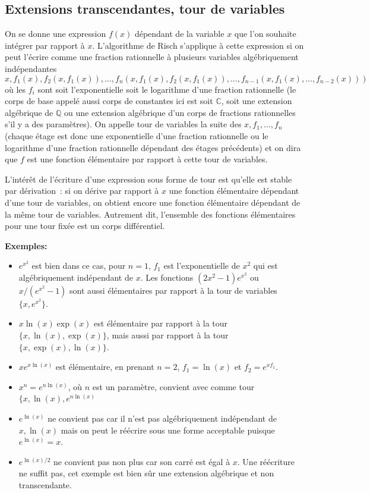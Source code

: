 \documentclass[a4paper,11pt]{book}
\begin{document}
\begin{giacjshere}
\subsection{Extensions transcendantes, tour de variables}
On se donne une expression $f(x)$ dépendant de la variable $x$ que l'on 
souhaite intégrer par rapport à $x$. L'algorithme de Risch s'applique à
cette expression si on peut l'écrire comme une fraction rationnelle à
plusieurs variables algébriquement indépendantes
\[ x, f_1(x), f_2(x,f_1(x)), ..., 
f_n(x,f_1(x),f_2(x,f_1(x)),...,f_{n-1}(x,f_1(x),...,f_{n-2}(x))) \]
où les $f_i$ sont soit l'exponentielle soit le logarithme d'une fraction
rationnelle (le corps de base appelé aussi corps de
constantes ici est soit $\mathbb{C}$, soit une extension algébrique de $\mathbb{Q}$ ou une
extension algébrique d'un corps de fractions rationnelles s'il
y a des paramètres). 
On appelle tour de variables
la suite des $x,f_1,...,f_n$ (chaque étage est donc une exponentielle
d'une fraction rationnelle ou le logarithme d'une fraction rationnelle
dépendant des étages précédents) 
et on dira que $f$ est une fonction élémentaire
par rapport à cette tour de variables.

L'intérêt de l'écriture d'une expression sous forme de tour est 
qu'elle est stable par dérivation~: 
si on dérive par rapport à $x$
une fonction élémentaire dépendant d'une tour de variables, on obtient encore 
une fonction élémentaire dépendant de la même tour de variables.
Autrement dit, l'ensemble des fonctions \'el\'ementaires pour une tour 
fix\'ee est un corps diff\'erentiel.

{\bf Exemples: }
\begin{itemize}
\item $e^{x^2}$ est bien dans ce cas, pour $n=1$, $f_1$
est l'exponentielle de $x^2$ qui est algébriquement indépendant
de $x$. Les fonctions $(2x^2-1)e^{x^2}$
ou $x/(e^{x^2}-1)$ sont aussi élémentaires par rapport à
la tour de variables $\{x,e^{x^2} \}$.  
\item $x \ln(x) \exp(x)$ est élémentaire par rapport à la tour
$\{ x, \ln(x), \exp(x)\}$, mais aussi par rapport à la tour
$\{ x, \exp(x), \ln(x)\}$.
\item $xe^{x \ln(x)}$ est élémentaire, en prenant $n=2$, $f_1=\ln(x)$
et $f_2=e^{x f_1}$.
\item $x^n=e^{n\ln(x)}$, o\`u $n$ est un param\`etre, convient avec
comme tour $\{x, \ln(x), e^{n \ln(x) }$
\item $e^{\ln(x)}$ ne convient pas car il n'est pas algébriquement
indépendant de $x,\ln(x)$ mais on peut le réécrire sous une forme
acceptable puisque $e^{\ln(x)}=x$.
\item $e^{\ln(x)/2}$ ne convient pas non plus car son carré est égal à $x$.
Une réécriture ne suffit pas, cet exemple est bien sûr une extension
algébrique et non transcendante.
\end{itemize}


\end{giacjshere}
\end{document}

